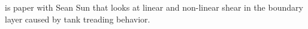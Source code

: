 \documentclass[twoside,twocolumn,9pt]{article}
\begin{document}
\citet{ram-kom-sek-ima2010}

\citet{che-lyu-jae-leo2020}

\citet{wan-ii-sug-nod-jin-liu-che-gon2023}

\citet{mis-wis-ber-key-li-tun-law-per-erd-zha-zha-sun-kal-lam-kon2019}
is paper with Sean Sun that looks at linear and non-linear shear in the
boundary layer caused by tank treading behavior.








\end{document}
